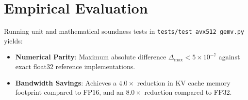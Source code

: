 \documentclass[11pt,a4paper]{article}
\begin{document}
\section{Empirical Evaluation}
Running unit and mathematical soundness tests in \texttt{tests/test\_avx512\_gemv.py} yields:
\begin{itemize}
    \item \textbf{Numerical Parity}: Maximum absolute difference $\Delta_{\max} < 5 \times 10^{-7}$ against exact float32 reference implementations.
    \item \textbf{Bandwidth Savings}: Achieves a $4.0\times$ reduction in KV cache memory footprint compared to FP16, and an $8.0\times$ reduction compared to FP32.
\end{itemize}
\end{document}
